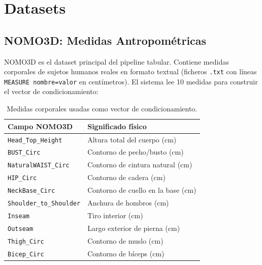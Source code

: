 \documentclass[a4paper,11pt]{article}
\begin{document}
\section{Datasets}

\subsection{NOMO3D: Medidas Antropométricas}

NOMO3D es el dataset principal del pipeline tabular. Contiene medidas corporales
de sujetos humanos reales en formato textual (ficheros \texttt{.txt} con líneas
\texttt{MEASURE nombre=valor} en centímetros). El sistema lee 10 medidas para
construir el vector de condicionamiento:

\begin{table}[H]
    \centering
    \caption{Medidas corporales usadas como vector de condicionamiento.}
    \label{tab:medidas}
    \begin{tabular}{@{}ll@{}}
        \toprule
        \textbf{Campo NOMO3D} & \textbf{Significado físico} \\
        \midrule
        \texttt{Head\_Top\_Height}        & Altura total del cuerpo (cm)          \\
        \texttt{BUST\_Circ}               & Contorno de pecho/busto (cm)          \\
        \texttt{NaturalWAIST\_Circ}       & Contorno de cintura natural (cm)      \\
        \texttt{HIP\_Circ}                & Contorno de cadera (cm)               \\
        \texttt{NeckBase\_Circ}           & Contorno de cuello en la base (cm)    \\
        \texttt{Shoulder\_to\_Shoulder}   & Anchura de hombros (cm)               \\
        \texttt{Inseam}                   & Tiro interior (cm)                    \\
        \texttt{Outseam}                  & Largo exterior de pierna (cm)         \\
        \texttt{Thigh\_Circ}              & Contorno de muslo (cm)                \\
        \texttt{Bicep\_Circ}              & Contorno de bíceps (cm)               \\
        \bottomrule
    \end{tabular}
\end{table}
\end{document}
